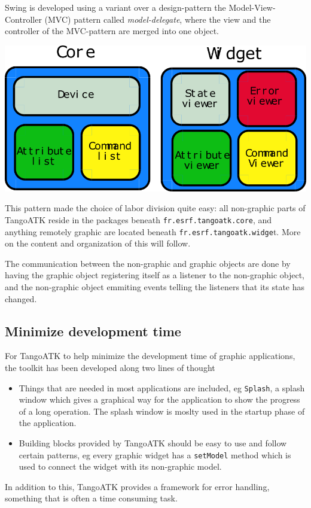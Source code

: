 Swing is developed using a variant over a design-pattern the Model-View-Controller
(MVC) pattern called \emph{model-delegate}, where the
view and the controller of the MVC-pattern are merged into one object.

\begin{center}
\includegraphics[scale=0.6]{atk/img/core-widget}\\

\par\end{center}

This pattern made the choice of labor division quite easy: all non-graphic
parts of TangoATK reside in the packages beneath \texttt{fr.esrf.tangoatk.core},
and anything remotely graphic are located beneath \texttt{fr.esrf.tangoatk.widge}t.
More on the content and organization of this will follow.

The communication between the non-graphic and graphic objects are
done by having the graphic object registering itself as a listener
to the non-graphic object, and the non-graphic object emmiting events
telling the listeners that its state has changed.


\subsection{Minimize development time}

For TangoATK to help minimize the development time of graphic applications,
the toolkit has been developed along two lines of thought
\begin{itemize}
\item Things that are needed in most applications are included, eg \texttt{Splash},
a splash window which gives a graphical way for the
application to show the progress of a long operation. The splash window
is moslty used in the startup phase of the application.
\item Building blocks provided by TangoATK should be easy to use and follow
certain patterns, eg every graphic widget has a \texttt{setModel}
method which is used to connect the widget with its non-graphic model. 
\end{itemize}
In addition to this, TangoATK provides a framework for error handling,
something that is often a time consuming task.


